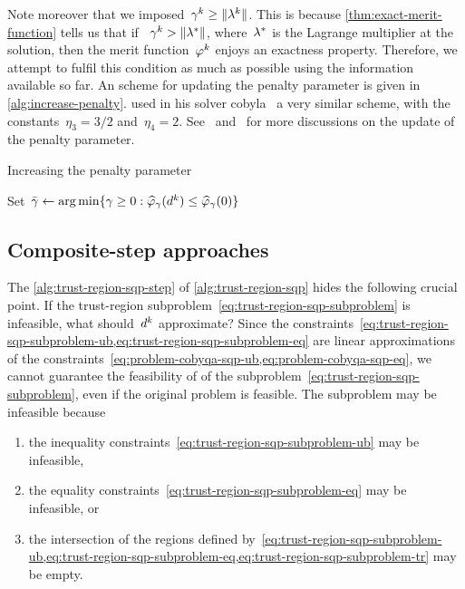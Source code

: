 Note moreover that we imposed~$\gamma^k \ge \norm{\lm[k]}$.
This is because \cref{thm:exact-merit-function} tells us that if ~$\gamma^k > \norm{\lm[\ast]}$, where~$\lm[\ast]$ is the Lagrange multiplier at the solution, then the merit function~$\merit[k]$ enjoys an exactness property.
Therefore, we attempt to fulfil this condition as much as possible using the information available so far.
An scheme for updating the penalty parameter is given in \cref{alg:increase-penalty}.
\citeauthor{Powell_1994} used in his solver \gls{cobyla}~\cite{Powell_1994} a very similar scheme, with the constants~$\eta_3 = 3/2$ and~$\eta_4 = 2$.
See~\cite[pp.~661--662]{Conn_Gould_Toint_2000} and~\cite[p.~542]{Nocedal_Wright_2006} for more discussions on the update of the penalty parameter.

\begin{algorithm}
    \caption{Increasing the penalty parameter}
    \label{alg:increase-penalty}
    \DontPrintSemicolon
    Set~$\bar{\gamma} \gets \argmin \set{\gamma \ge 0 : \meritm_{\gamma}(\step[k]) \le \meritm_{\gamma}(0)}$\;
\end{algorithm}

\subsection{Composite-step approaches}

The \cref{alg:trust-region-sqp-step} of \cref{alg:trust-region-sqp} hides the following crucial point.
If the trust-region subproblem~\cref{eq:trust-region-sqp-subproblem} is infeasible, what should~$\step[k]$ approximate?
Since the constraints~\cref{eq:trust-region-sqp-subproblem-ub,eq:trust-region-sqp-subproblem-eq} are linear approximations of the constraints~\cref{eq:problem-cobyqa-sqp-ub,eq:problem-cobyqa-sqp-eq}, we cannot guarantee the feasibility of of the subproblem~\cref{eq:trust-region-sqp-subproblem}, even if the original problem is feasible.
The subproblem may be infeasible because
\begin{enumerate}
    \item the inequality constraints~\cref{eq:trust-region-sqp-subproblem-ub} may be infeasible,
    \item the equality constraints~\cref{eq:trust-region-sqp-subproblem-eq} may be infeasible, or
    \item the intersection of the regions defined by~\cref{eq:trust-region-sqp-subproblem-ub,eq:trust-region-sqp-subproblem-eq,eq:trust-region-sqp-subproblem-tr} may be empty.
\end{enumerate}


